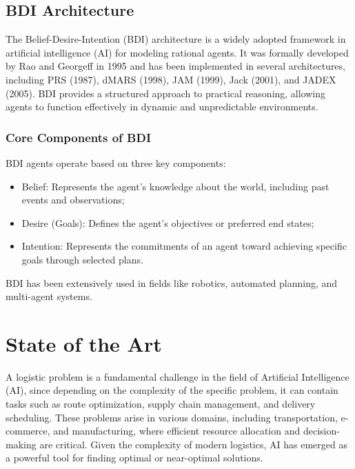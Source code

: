 \subsection{BDI Architecture}
\label{sub:bdi_architecture}

The Belief-Desire-Intention (BDI) architecture is a widely adopted framework in artificial
intelligence (AI) for modeling rational agents. It was formally developed by Rao
and Georgeff in 1995 \cite{bdi-icmas95} and has been implemented in several
architectures, including PRS (1987), dMARS (1998), JAM (1999), Jack (2001), and JADEX
(2005). BDI provides a structured approach to practical reasoning, allowing agents
to function effectively in dynamic and unpredictable environments.

\subsubsection{Core Components of BDI}
BDI agents operate based on three key components:
\begin{itemize}
  \item Belief: Represents the agent's knowledge about the world, including past
    events and observations;

  \item Desire (Goals): Defines the agent's objectives or preferred end states;

  \item Intention: Represents the commitments of an agent toward achieving
    specific goals through selected plans.
\end{itemize}

BDI has been extensively used in fields like robotics, automated planning, and multi-agent
systems.

\section{State of the Art}
\label{sec:state_of_the_art}

A logistic problem is a fundamental challenge in the field of Artificial
Intelligence (AI), since depending on the complexity of the specific problem, it
can contain tasks such as route optimization, supply chain management, and
delivery scheduling. These problems arise in various domains, including
transportation, e-commerce, and manufacturing, where efficient resource allocation
and decision-making are critical. Given the complexity of modern logistics, AI has
emerged as a powerful tool for finding optimal or near-optimal solutions.

